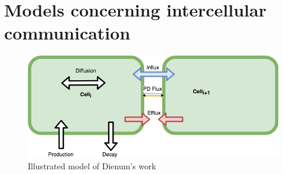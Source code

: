 \documentclass[../main.tex]{subfiles}
\begin{document}
\section{Models concerning intercellular communication}
\label{sec:stateofmodelling}

\cite{deinumSimpleModelsComplex2013, deinumPlasmodesmaGeometryEffective2019}

\begin{figure}[ht]
  \centering
  \includegraphics[width=\columnwidth]{figures/symplastic_model.png}
  \caption{\label{fig:deinummodel} Illustrated model of Dienum's work}
\end{figure}

   
\end{document}
